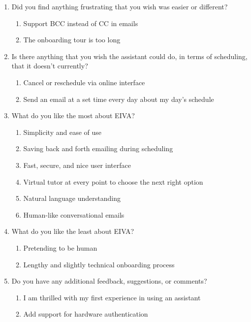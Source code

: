 \documentclass{article}
\begin{document}
\begin{enumerate}
	\item Did you find anything frustrating that you wish was easier or different?
	      \begin{enumerate}
	      	\item Support BCC instead of CC in emails
	      	\item The onboarding tour is too long
	      \end{enumerate}
	\item Is there anything that you wish the assistant could do, in terms of scheduling, that it doesn't currently?
	      \begin{enumerate}
	      	\item Cancel or reschedule via online interface
	      	\item Send an email at a set time every day about my day's schedule
	      \end{enumerate}
	\item What do you like the most about EIVA?
	      \begin{enumerate}
	      	\item Simplicity and ease of use
	      	\item Saving back and forth emailing during scheduling
	      	\item Fast, secure, and nice user interface
	      	\item Virtual tutor at every point to choose the next right option
	      	\item Natural language understanding
	      	\item Human-like conversational emails
	      \end{enumerate}
	\item What do you like the least about EIVA?
	      \begin{enumerate}
	      	\item Pretending to be human
	      	\item Lengthy and slightly technical onboarding process
	      \end{enumerate}
	\item Do you have any additional feedback, suggestions, or comments?
	      \begin{enumerate}
	      	\item I am thrilled with my first experience in using an assistant
	      	\item Add support for hardware authentication
	      \end{enumerate}
\end{enumerate}
\end{document}
